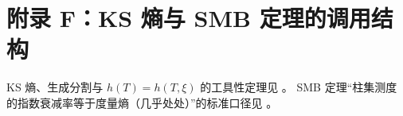\section{附录 F：KS 熵与 SMB 定理的调用结构}

KS 熵、生成分割与 $h(T)=h(T,\xi)$ 的工具性定理见 \cite{ScholarpediaKSEntropy}。
SMB 定理“柱集测度的指数衰减率等于度量熵（几乎处处）”的标准口径见 \cite{GatechSMB}。

